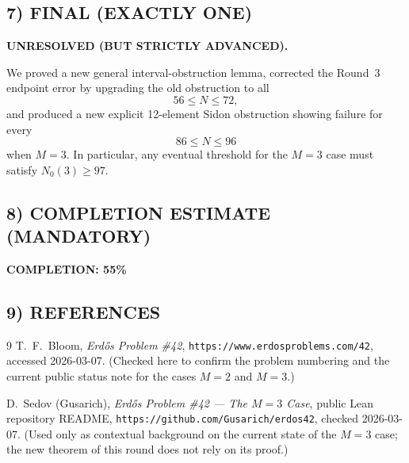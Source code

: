 \subsection{7) FINAL (EXACTLY ONE)}
\textbf{UNRESOLVED (BUT STRICTLY ADVANCED).}

We proved a new general interval-obstruction lemma, corrected the Round~3 endpoint error by upgrading the old obstruction to all
\[
56\le N\le 72,
\]
and produced a new explicit 12-element Sidon obstruction showing failure for every
\[
86\le N\le 96
\]
when \(M=3\).  In particular, any eventual threshold for the \(M=3\) case must satisfy \(N_0(3)\ge 97\).

\subsection{8) COMPLETION ESTIMATE (MANDATORY)}
\textbf{COMPLETION: 55\%}

\subsection{9) REFERENCES}
\begin{thebibliography}{9}
T.~F.~Bloom,
\emph{Erd\H{o}s Problem \#42}, \texttt{https://www.erdosproblems.com/42}, accessed 2026-03-07.
(Checked here to confirm the problem numbering and the current public status note for the cases \(M=2\) and \(M=3\).)

D.~Sedov (Gusarich),
\emph{Erd\H{o}s Problem \#42 --- The \(M=3\) Case}, public Lean repository README,
\texttt{https://github.com/Gusarich/erdos42}, checked 2026-03-07.
(Used only as contextual background on the current state of the \(M=3\) case; the new theorem of this round does not rely on its proof.)
\end{thebibliography}
